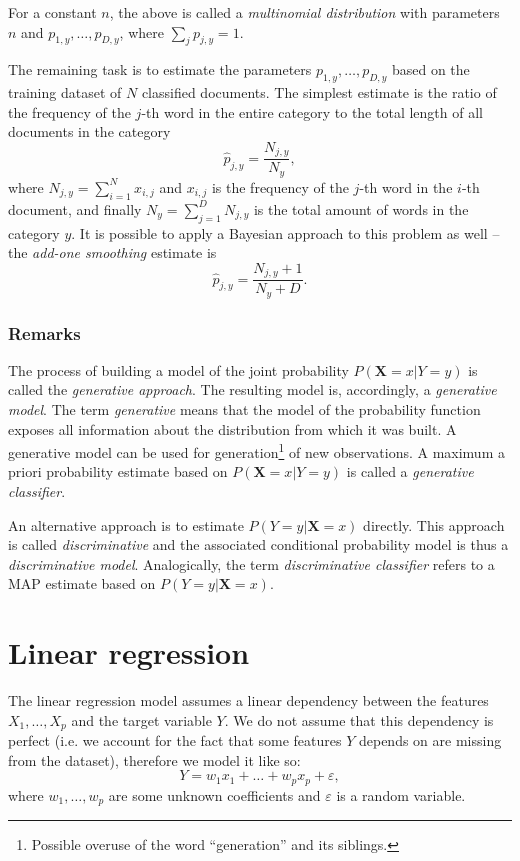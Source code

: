 \documentclass[a4paper]{article}
\begin{document}
	For a constant $n$, the above is called a \textit{multinomial distribution}
	with parameters $n$ and $p_{1, y}, \ldots, p_{D, y}$, where $\sum_j p_{j, y} = 1$.

	The remaining task is to estimate the parameters $p_{1, y}, \ldots, p_{D, y}$
	based on the training dataset of $N$ classified documents. The simplest
	estimate is the ratio of the frequency of the $j$-th word in the entire
	category to the total length of all documents in the category \[
		\hat{p}_{j, y} = \frac{N_{j,y}}{N_y}
	,\] where $N_{j,y} = \sum_{i = 1}^N x_{i,j}$ and $x_{i, j}$ is the
	frequency of the $j$-th word in the $i $-th document, and finally
	$N_y = \sum_{j = 1}^D N_{j, y}$ is the total amount of words in the
	category $y$. It is possible to apply a Bayesian approach to this problem
	as well -- the \textit{add-one smoothing} estimate is \[
		\hat{p}_{j, y} = \frac{N_{j,y} + 1}{N_y + D}
	.\]

	\subsubsection{Remarks}
	The process of building a model of the joint probability $P(\boldsymbol{X} = x | Y = y)$
	is called the \textit{generative approach}. The resulting model is, accordingly,
	a \textit{generative model}. The term \textit{generative} means that
	the model of the probability function exposes all information about
	the distribution from which it was built. A generative model can be used for
	generation\footnote{Possible overuse of the word \enquote{generation} and its
	siblings.} of new observations. A maximum a priori probability estimate
	based on $P(\boldsymbol{X} = x | Y = y)$ is called a \textit{generative classifier}.

	An alternative approach is to estimate $P(Y = y | \boldsymbol{X} = x)$ directly.
	This approach is called \textit{discriminative} and the associated
	conditional probability model is thus a \textit{discriminative model}.
	Analogically, the term \textit{discriminative classifier} refers to
	a MAP estimate based on $P(Y = y | \boldsymbol{X} = x)$.

	\section{Linear regression}
	The linear regression model assumes a linear dependency between the features
	$X_1, \ldots, X_p$ and the target variable $Y$. We do not assume that this
	dependency is perfect (i.e. we account for the fact that some features $Y$ depends
	on are missing from the dataset), therefore we model it like so: \[
		Y = w_1x_1 + \ldots + w_p x_p + \varepsilon
	,\] where $w_1, \ldots, w_p$ are some unknown coefficients and $\varepsilon$
	is a random variable.
\end{document}
